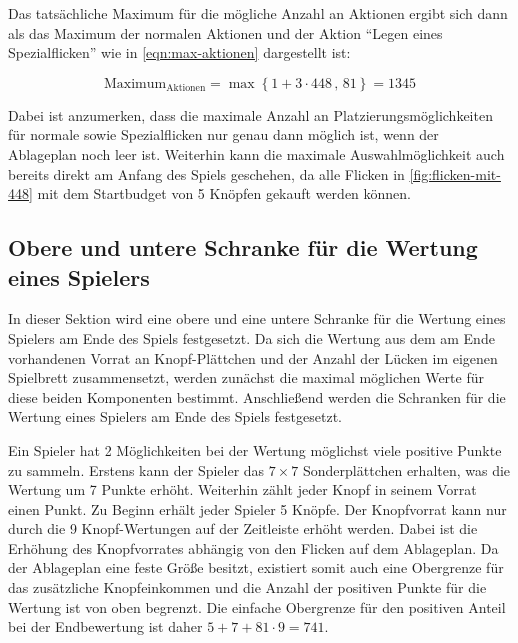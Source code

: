 Das tatsächliche Maximum für die mögliche Anzahl an Aktionen ergibt sich dann als das Maximum der normalen Aktionen und der Aktion \enquote{Legen eines Spezialflicken} wie in \ref{eqn:max-aktionen} dargestellt ist:

\vspace*{-0.4cm}
\begin{equation}
    \label{eqn:max-aktionen}
    \text{Maximum}_{\text{Aktionen}} = \max \left\{ 1 + 3 \cdot 448\, ,\, 81 \right\} = 1345
\end{equation}

Dabei ist anzumerken, dass die maximale Anzahl an Platzierungsmöglichkeiten für normale sowie Spezialflicken nur genau dann möglich ist, wenn der Ablageplan noch leer ist. Weiterhin kann die maximale Auswahlmöglichkeit auch bereits direkt am Anfang des Spiels geschehen, da alle Flicken in \ref{fig:flicken-mit-448} mit dem Startbudget von 5 Knöpfen gekauft werden können.

\subsection*{Obere und untere Schranke für die Wertung eines Spielers}

In dieser Sektion wird eine obere und eine untere Schranke für die Wertung eines Spielers am Ende des Spiels festgesetzt. Da sich die Wertung aus dem am Ende vorhandenen Vorrat an Knopf-Plättchen und der Anzahl der Lücken im eigenen Spielbrett zusammensetzt, werden zunächst die maximal möglichen Werte für diese beiden Komponenten bestimmt. Anschließend werden die Schranken für die Wertung eines Spielers am Ende des Spiels festgesetzt.


Ein Spieler hat 2 Möglichkeiten bei der Wertung möglichst viele positive Punkte zu sammeln. Erstens kann der Spieler das $7 \times 7$ Sonderplättchen erhalten, was die Wertung um 7 Punkte erhöht. Weiterhin zählt jeder Knopf in seinem Vorrat einen Punkt. Zu Beginn erhält jeder Spieler 5 Knöpfe. Der Knopfvorrat kann nur durch die 9 Knopf-Wertungen auf der Zeitleiste erhöht werden. Dabei ist die Erhöhung des Knopfvorrates abhängig von den Flicken auf dem Ablageplan. Da der Ablageplan eine feste Größe besitzt, existiert somit auch eine Obergrenze für das zusätzliche Knopfeinkommen und die Anzahl der positiven Punkte für die Wertung ist von oben begrenzt. Die einfache Obergrenze für den positiven Anteil bei der Endbewertung ist daher $5+7+81\cdot 9=741$.

